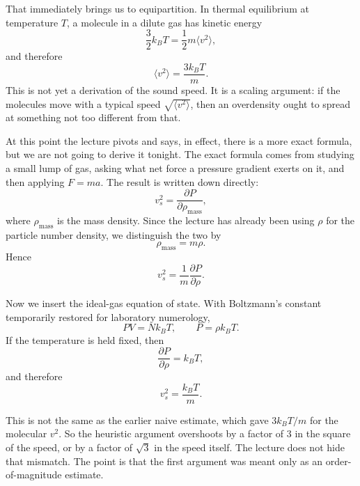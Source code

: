 That immediately brings us to equipartition. In thermal equilibrium at temperature \(T\), a molecule in a dilute gas has kinetic energy
\begin{equation}
\frac{3}{2}k_B T=\frac{1}{2}m\langle v^2\rangle,
\end{equation}
and therefore
\begin{equation}
\langle v^2\rangle=\frac{3k_B T}{m}.
\end{equation}
This is not yet a derivation of the sound speed. It is a scaling argument: if the molecules move with a typical speed \(\sqrt{\langle v^2\rangle}\), then an overdensity ought to spread at something not too different from that.

At this point the lecture pivots and says, in effect, there is a more exact formula, but we are not going to derive it tonight. The exact formula comes from studying a small lump of gas, asking what net force a pressure gradient exerts on it, and then applying \(F=ma\). The result is written down directly:
\begin{equation}
v_s^2=\frac{\partial P}{\partial \rho_{\mathrm{mass}}},
\end{equation}
where \(\rho_{\mathrm{mass}}\) is the mass density. Since the lecture has already been using \(\rho\) for the particle number density, we distinguish the two by
\begin{equation}
\rho_{\mathrm{mass}}=m\rho.
\end{equation}
Hence
\begin{equation}
v_s^2=\frac{1}{m}\frac{\partial P}{\partial \rho}.
\end{equation}

Now we insert the ideal-gas equation of state. With Boltzmann's constant temporarily restored for laboratory numerology,
\begin{equation}
PV=Nk_B T,
\qquad
P=\rho k_B T.
\end{equation}
If the temperature is held fixed, then
\begin{equation}
\frac{\partial P}{\partial \rho}=k_B T,
\end{equation}
and therefore
\begin{equation}
v_s^2=\frac{k_B T}{m}.
\end{equation}

This is not the same as the earlier naive estimate, which gave \(3k_B T/m\) for the molecular \(v^2\). So the heuristic argument overshoots by a factor of \(3\) in the square of the speed, or by a factor of \(\sqrt{3}\) in the speed itself. The lecture does not hide that mismatch. The point is that the first argument was meant only as an order-of-magnitude estimate.


